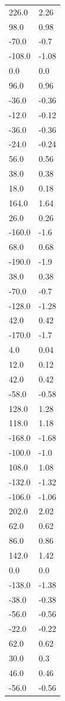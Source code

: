 \begin{longtable}{ll}
226.0 & 2.26 \\
98.0 & 0.98 \\
-70.0 & -0.7 \\
-108.0 & -1.08 \\
0.0 & 0.0 \\
96.0 & 0.96 \\
-36.0 & -0.36 \\
-12.0 & -0.12 \\
-36.0 & -0.36 \\
-24.0 & -0.24 \\
56.0 & 0.56 \\
38.0 & 0.38 \\
18.0 & 0.18 \\
164.0 & 1.64 \\
26.0 & 0.26 \\
-160.0 & -1.6 \\
68.0 & 0.68 \\
-190.0 & -1.9 \\
38.0 & 0.38 \\
-70.0 & -0.7 \\
-128.0 & -1.28 \\
42.0 & 0.42 \\
-170.0 & -1.7 \\
4.0 & 0.04 \\
12.0 & 0.12 \\
42.0 & 0.42 \\
-58.0 & -0.58 \\
128.0 & 1.28 \\
118.0 & 1.18 \\
-168.0 & -1.68 \\
-100.0 & -1.0 \\
108.0 & 1.08 \\
-132.0 & -1.32 \\
-106.0 & -1.06 \\
202.0 & 2.02 \\
62.0 & 0.62 \\
86.0 & 0.86 \\
142.0 & 1.42 \\
0.0 & 0.0 \\
-138.0 & -1.38 \\
-38.0 & -0.38 \\
-56.0 & -0.56 \\
-22.0 & -0.22 \\
62.0 & 0.62 \\
30.0 & 0.3 \\
46.0 & 0.46 \\
-56.0 & -0.56 \\

\end{longtable}

